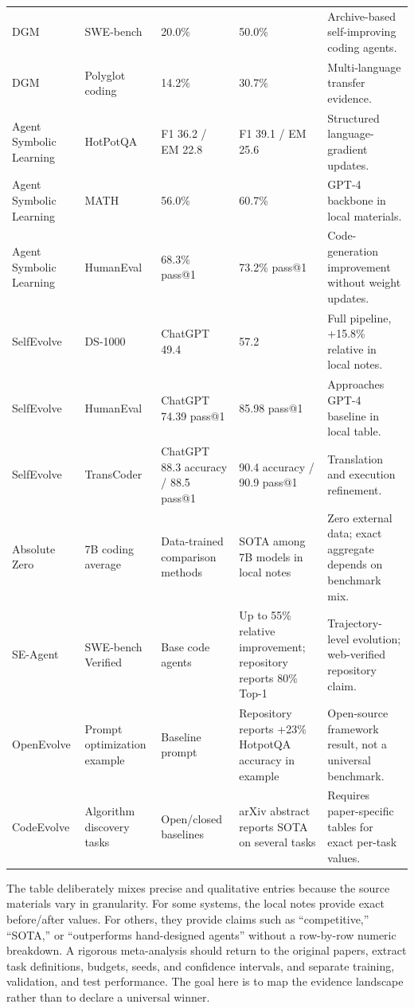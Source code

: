 {\begin{longtable}{@{}L{0.13\textwidth}L{0.18\textwidth}L{0.17\textwidth}L{0.18\textwidth}L{0.28\textwidth}@{}}
DGM & SWE-bench & 20.0\% & 50.0\% & Archive-based self-improving coding agents. \\
DGM & Polyglot coding & 14.2\% & 30.7\% & Multi-language transfer evidence. \\
Agent Symbolic Learning & HotPotQA & F1 36.2 / EM 22.8 & F1 39.1 / EM 25.6 & Structured language-gradient updates. \\
Agent Symbolic Learning & MATH & 56.0\% & 60.7\% & GPT-4 backbone in local materials. \\
Agent Symbolic Learning & HumanEval & 68.3\% pass@1 & 73.2\% pass@1 & Code-generation improvement without weight updates. \\
SelfEvolve & DS-1000 & ChatGPT 49.4 & 57.2 & Full pipeline, +15.8\% relative in local notes. \\
SelfEvolve & HumanEval & ChatGPT 74.39 pass@1 & 85.98 pass@1 & Approaches GPT-4 baseline in local table. \\
SelfEvolve & TransCoder & ChatGPT 88.3 accuracy / 88.5 pass@1 & 90.4 accuracy / 90.9 pass@1 & Translation and execution refinement. \\
Absolute Zero & 7B coding average & Data-trained comparison methods & SOTA among 7B models in local notes & Zero external data; exact aggregate depends on benchmark mix. \\
SE-Agent & SWE-bench Verified & Base code agents & Up to 55\% relative improvement; repository reports 80\% Top-1 & Trajectory-level evolution; web-verified repository claim. \\
OpenEvolve & Prompt optimization example & Baseline prompt & Repository reports +23\% HotpotQA accuracy in example & Open-source framework result, not a universal benchmark. \\
CodeEvolve & Algorithm discovery tasks & Open/closed baselines & arXiv abstract reports SOTA on several tasks & Requires paper-specific tables for exact per-task values. \\
\end{longtable}}

The table deliberately mixes precise and qualitative entries because the source materials vary in granularity.  For some systems, the local notes provide exact before/after values.  For others, they provide claims such as ``competitive,'' ``SOTA,'' or ``outperforms hand-designed agents'' without a row-by-row numeric breakdown.  A rigorous meta-analysis should return to the original papers, extract task definitions, budgets, seeds, and confidence intervals, and separate training, validation, and test performance.  The goal here is to map the evidence landscape rather than to declare a universal winner.

